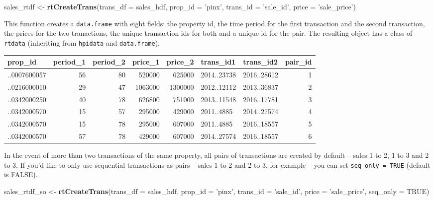 \documentclass[]{article}
\newenvironment{Shaded}{\begin{snugshade}}{\end{snugshade}}
\newcommand{\DataTypeTok}[1]{\textcolor[rgb]{0.13,0.29,0.53}{#1}}
\newcommand{\KeywordTok}[1]{\textcolor[rgb]{0.13,0.29,0.53}{\textbf{#1}}}
\newcommand{\NormalTok}[1]{#1}
\newcommand{\OtherTok}[1]{\textcolor[rgb]{0.56,0.35,0.01}{#1}}
\newcommand{\StringTok}[1]{\textcolor[rgb]{0.31,0.60,0.02}{#1}}
\begin{document}
\begin{Shaded}
\begin{Highlighting}[]
\NormalTok{  sales_rtdf <-}\StringTok{ }\KeywordTok{rtCreateTrans}\NormalTok{(}\DataTypeTok{trans_df =}\NormalTok{ sales_hdf,}
                              \DataTypeTok{prop_id =} \StringTok{'pinx'}\NormalTok{,}
                              \DataTypeTok{trans_id =} \StringTok{'sale_id'}\NormalTok{,}
                              \DataTypeTok{price =} \StringTok{'sale_price'}\NormalTok{)}
                          
\end{Highlighting}
\end{Shaded}

This function creates a \texttt{data.frame} with eight fields: the
property id, the time period for the first transaction and the second
transaction, the prices for the two tranactions, the unique transaction
ids for both and a unique id for the pair. The resulting object has a
class of \texttt{rtdata} (inheriting from \texttt{hpidata} and
\texttt{data.frame}).

\begin{longtable}[]{@{}lrrrrllr@{}}
\toprule
prop\_id & period\_1 & period\_2 & price\_1 & price\_2 & trans\_id1 &
trans\_id2 & pair\_id\tabularnewline
\midrule
\endhead
..0007600057 & 56 & 80 & 520000 & 625000 & 2014..23738 & 2016..28612 &
1\tabularnewline
..0216000010 & 29 & 47 & 1063000 & 1300000 & 2012..12112 & 2013..36837 &
2\tabularnewline
..0342000250 & 40 & 78 & 626800 & 751000 & 2013..11548 & 2016..17781 &
3\tabularnewline
..0342000570 & 15 & 57 & 295000 & 429000 & 2011..4885 & 2014..27574 &
4\tabularnewline
..0342000570 & 15 & 78 & 295000 & 607000 & 2011..4885 & 2016..18557 &
5\tabularnewline
..0342000570 & 57 & 78 & 429000 & 607000 & 2014..27574 & 2016..18557 &
6\tabularnewline
\bottomrule
\end{longtable}

In the event of more than two transactions of the same property, all
pairs of transactions are created by default -- sales 1 to 2, 1 to 3 and
2 to 3. If you'd like to only use sequential transactions as pairs --
sales 1 to 2 and 2 to 3, for example -- you can set
\texttt{seq\_only\ =\ TRUE} (default is FALSE).

\begin{Shaded}
\begin{Highlighting}[]
\NormalTok{  sales_rtdf_so <-}\StringTok{ }\KeywordTok{rtCreateTrans}\NormalTok{(}\DataTypeTok{trans_df =}\NormalTok{ sales_hdf,}
                                 \DataTypeTok{prop_id =} \StringTok{'pinx'}\NormalTok{,}
                                 \DataTypeTok{trans_id =} \StringTok{'sale_id'}\NormalTok{,}
                                 \DataTypeTok{price =} \StringTok{'sale_price'}\NormalTok{,}
                                 \DataTypeTok{seq_only =} \OtherTok{TRUE}\NormalTok{)}
\end{Highlighting}
\end{Shaded}
\end{document}
